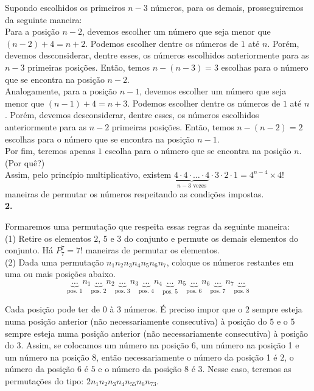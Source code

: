 \documentclass[12pt, a4paper]{article}
\begin{document}
Supondo escolhidos os primeiros \(n-3\) números, para os demais, prosseguiremos da seguinte maneira: \\

Para a posição \(n-2\), devemos escolher um número que seja menor que \((n-2)+4=n+2\). Podemos escolher dentre os números de \(1\) até \(n\). Porém, devemos desconsiderar, dentre esses, os números escolhidos anteriormente para as \(n-3\) primeiras posições. Então, temos \(n - (n-3) = 3\) escolhas para o número que se encontra na posição \(n-2\). \\

Analogamente, para a posição \(n-1\), devemos escolher um número que seja menor que \((n-1)+4=n+3\). Podemos escolher dentre os números de \(1\) até \(n\). Porém, devemos desconsiderar, dentre esses, os números escolhidos anteriormente para as \(n-2\) primeiras posições. Então, temos \(n - (n-2) = 2\) escolhas para o número que se encontra na posição \(n-1\). \\

Por fim, teremos apenas \(1\) escolha para o número que se encontra na posição \(n\). (Por quê?) \\

Assim, pelo princípio multiplicativo, existem \(\underbrace{4\cdot{4}\cdot{\ldots}\cdot{4}}_{n-3 \text{ vezes}}\cdot{3}\cdot{2}\cdot{1} = 4^{n-4}\times 4!\) maneiras de permutar os números respeitando as condições impostas. \\

\textbf{2.}


Formaremos uma permutação que respeita essas regras da seguinte maneira: \\

(1) Retire os elementos \(2\), \(5\) e \(3\) do conjunto e permute os demais elementos do conjunto. Há \(P^7_7 = 7!\) maneiras de permutar os elementos. \\

(2) Dada uma permutação \(n_1 n_2 n_3 n_4 n_5 n_6 n_7\), coloque os números restantes em uma ou mais posições abaixo. 
\[\underbrace{\ldots}_{\text{pos. 1}}n_1 \underbrace{\ldots}_{\text{pos. 2}}n_2 \underbrace{\ldots}_{\text{pos. 3}}n_3 \underbrace{\ldots} _{\text{pos. 4}}n_4 \underbrace{\ldots} _{\text{pos. 5}}n_5 \underbrace{\ldots} _{\text{pos. 6}}n_6 \underbrace{\ldots}_{\text{pos. 7}}n_7 \underbrace{\ldots}_{\text{pos. 8}}\]

Cada posição pode ter de \(0\) à \(3\) números. É preciso impor que o \(2\) sempre esteja numa posição anterior (não necessariamente consecutiva) à posição do \(5\) e o \(5\) sempre esteja numa posição anterior (não necessariamente consecutiva) à posição do \(3\). Assim, se colocamos um número na posição 6, um número na posição 1 e um número na posição 8, então necessariamente o número da posição 1 é \(2\), o número da posição 6 é \(5\) e o número da posição 8 é \(3\). Nesse caso, teremos as permutações do tipo: \(2n_1n_2n_3n_4n_55n_6n_73\). \\
\end{document}
